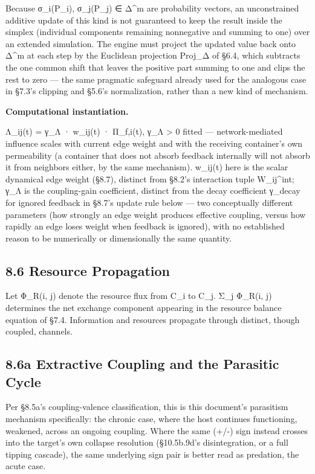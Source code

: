 \documentclass[
]{article}
\begin{document}
Because σ\_i(P\_i), σ\_j(P\_j) ∈ Δ\^{}m are probability vectors, an
unconstrained additive update of this kind is not guaranteed to keep the
result inside the simplex (individual components remaining nonnegative
and summing to one) over an extended simulation. The engine must project
the updated value back onto Δ\^{}m at each step by the Euclidean
projection Proj\_Δ of §6.4, which subtracts the one common shift that
leaves the positive part summing to one and clips the rest to zero ---
the same pragmatic safeguard already used for the analogous case in
§7.3's clipping and §5.6's normalization, rather than a new kind of
mechanism.

\textbf{Computational instantiation.}

Λ\_ij(t) = γ\_Λ · w\_ij(t) · Π\_f,i(t), γ\_Λ \textgreater{} 0 fitted ---
network-mediated influence scales with current edge weight and with the
receiving container's own permeability (a container that does not absorb
feedback internally will not absorb it from neighbors either, by the
same mechanism). w\_ij(t) here is the scalar dynamical edge weight
(§8.7), distinct from §8.2's interaction tuple W\_ij\^{}int; γ\_Λ is the
coupling-gain coefficient, distinct from the decay coefficient γ\_decay
for ignored feedback in §8.7's update rule below --- two conceptually
different parameters (how strongly an edge weight produces effective
coupling, versus how rapidly an edge loses weight when feedback is
ignored), with no established reason to be numerically or dimensionally
the same quantity.

\hypertarget{resource-propagation}{%
\subsection{8.6 Resource Propagation}\label{resource-propagation}}

Let Φ\_R(i, j) denote the resource flux from C\_i to C\_j. Σ\_j Φ\_R(i,
j) determines the net exchange component appearing in the resource
balance equation of §7.4. Information and resources propagate through
distinct, though coupled, channels.

\hypertarget{a-extractive-coupling-and-the-parasitic-cycle}{%
\subsection{8.6a Extractive Coupling and the Parasitic
Cycle}\label{a-extractive-coupling-and-the-parasitic-cycle}}

Per §8.5a's coupling-valence classification, this is this document's
parasitism mechanism specifically: the chronic case, where the host
continues functioning, weakened, across an ongoing coupling. Where the
same (+/-) sign instead crosses into the target's own collapse
resolution (§10.5b.9d's disintegration, or a full tipping cascade), the
same underlying sign pair is better read as predation, the acute case.
\end{document}
